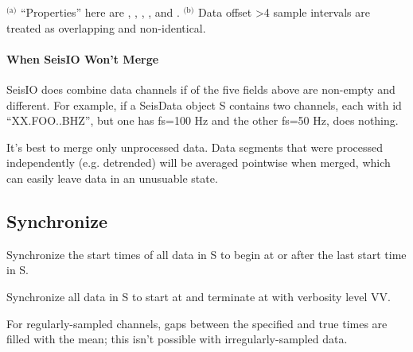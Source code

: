 \documentclass[letterpaper,11pt,english]{sphinxmanual}
\begin{document}
$^{\text{(a)}}$ “Properties” here are , , , , and .
$^{\text{(b)}}$ Data offset \textgreater{}4 sample intervals are treated as overlapping and non-identical.


\paragraph{When SeisIO Won’t Merge}
\label{\detokenize{src/Processing/processing:when-seisio-won-t-merge}}
SeisIO does  combine data channels if  of the five fields above
are non-empty and different. For example, if a SeisData object S contains two
channels, each with id “XX.FOO..BHZ”, but one has fs=100 Hz and the other fs=50 Hz,
 does nothing.

It’s best to merge only unprocessed data. Data segments that were processed
independently (e.g. detrended) will be averaged pointwise when merged, which
can easily leave data in an unusuable state.


\subsection{Synchronize}
\label{\detokenize{src/Processing/processing:synchronize}}

\begin{fulllineitems}
\end{fulllineitems}


Synchronize the start times of all data in S to begin at or after the last
start time in S.


\begin{fulllineitems}
\end{fulllineitems}


Synchronize all data in S to start at  and terminate at  with verbosity level VV.

For regularly-sampled channels, gaps between the specified and true times
are filled with the mean; this isn’t possible with irregularly-sampled data.
\end{document}
